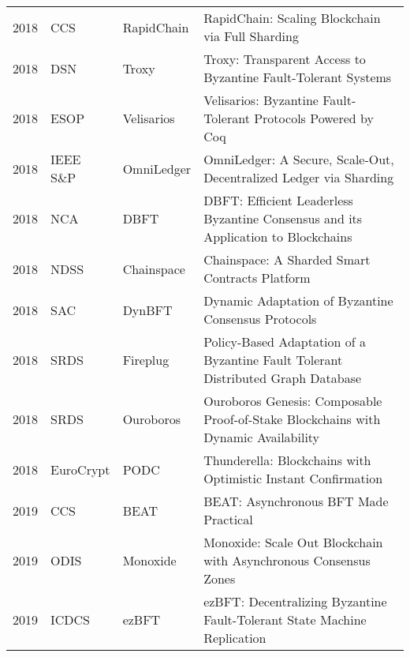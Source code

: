 \documentclass{article}
\begin{document}
\begin{landscape}
\begin{longtable}[c]{llll}
2018 & CCS               & RapidChain     & RapidChain: Scaling Blockchain via Full Sharding       \cite{cryptoeprint:2018:460}                                   \\
2018 & DSN               & Troxy          & Troxy: Transparent Access to Byzantine Fault-Tolerant Systems      \cite{8416471}                         \\
2018 & ESOP              & Velisarios     & Velisarios: Byzantine Fault-Tolerant Protocols Powered by Coq \cite{10.1007/978-3-319-89884-1_22}                            \\
2018 & IEEE S\&P         & OmniLedger     & OmniLedger: A Secure, Scale-Out, Decentralized Ledger via Sharding \cite{8418625}                       \\
2018 & NCA               & DBFT           & DBFT: Efficient Leaderless Byzantine Consensus and its Application to Blockchains         \\
2018 & NDSS              & Chainspace     & Chainspace: A Sharded Smart Contracts Platform                  \cite{DBLP:journals/corr/abs-1708-03778}                           \\
2018 & SAC               & DynBFT         & Dynamic Adaptation of Byzantine Consensus Protocols     \cite{Carvalho:2018:DAB:3167132.3167179}                                  \\
2018 & SRDS              & Fireplug       & Policy-Based Adaptation of a Byzantine Fault Tolerant Distributed Graph Database  \cite{8613954}         \\
2018 & SRDS              & Ouroboros      & Ouroboros Genesis: Composable Proof-of-Stake Blockchains with Dynamic Availability \cite{Badertscher:2018:OGC:3243734.3243848}     \\
2018 & EuroCrypt         & PODC           & Thunderella: Blockchains with Optimistic Instant Confirmation     \cite{10.1007/978-3-319-78375-8_1}                        \\
2019 & CCS               & BEAT           & BEAT: Asynchronous BFT Made Practical \cite{Duan:2018:BAB:3243734.3243812}                                                     \\
2019 & ODIS              & Monoxide       & Monoxide: Scale Out Blockchain with Asynchronous Consensus Zones    \cite{227661}                                          \\
2019 & ICDCS             & ezBFT          & ezBFT: Decentralizing Byzantine Fault-Tolerant State Machine Replication   \cite{DBLP:journals/corr/abs-1904-06023}               \\

\end{longtable}
\end{landscape}
\end{document}
